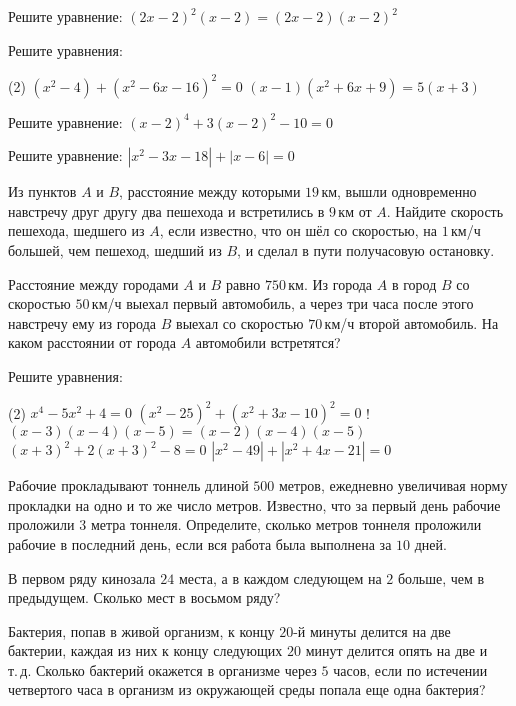 \begin{class}[number=3]
	\begin{listofex}
		\item Решите уравнение:
		\((2x-2)^2(x-2)=(2x-2)(x-2)^2\)
		\item Решите уравнения: 
		\begin{tasks}(2)
			\task \((x^2-4)+(x^2-6x-16)^2=0\)
			\task \( (x-1)(x^2+6x+9)=5(x+3) \)
		\end{tasks}
		\item Решите уравнение: \quad \( (x-2)^4+3(x-2)^2-10=0 \)
		\item Решите уравнение: \quad \( |x^2-3x-18|+|x-6|=0 \)
		\item Из пунктов \( A \) и \( B \), расстояние между которыми \( 19 \) км, вышли одновременно навстречу друг другу два пешехода и встретились в \( 9 \) км от \( A \). Найдите скорость пешехода, шедшего из \( A \), если известно, что он шёл со скоростью, на \( 1 \) км/ч большей, чем пешеход, шедший из \( B \), и сделал в пути получасовую остановку.
		\item Расстояние между городами \( A \) и \( B \) равно \( 750 \) км. Из города \( A \) в город \( B \) со скоростью \( 50 \) км/ч выехал первый автомобиль, а через три часа после этого навстречу ему из города \( B \) выехал со скоростью \( 70 \) км/ч второй автомобиль. На каком расстоянии от города \( A \) автомобили встретятся?
	\end{listofex}
\end{class}

\begin{class}[number=4]
	\begin{listofex}
		\item Решите уравнения:
		\begin{tasks}(2)
			\task \( x^4-5x^2+4=0 \)
			\task \( (x^2-25)^2+(x^2+3x-10)^2=0 \)
			\task! \( (x-3)(x-4)(x-5)=(x-2)(x-4)(x-5) \)
			\task \( (x+3)^2+2(x+3)^2-8=0 \)
			\task \( |x^2-49|+|x^2+4x-21|=0 \)
		\end{tasks}
		\item Рабочие прокладывают тоннель длиной \( 500 \) метров, ежедневно увеличивая норму прокладки на одно и то же число метров. Известно, что за первый день рабочие проложили \( 3 \) метра тоннеля. Определите, сколько метров тоннеля проложили рабочие в последний день, если вся работа была выполнена за \( 10 \) дней.
		\item В первом ряду кинозала \( 24 \) места, а в каждом следующем на \( 2 \) больше, чем в предыдущем. Сколько мест в восьмом ряду?
		\item Бактерия, попав в живой организм, к концу \( 20 \)-й минуты делится на две бактерии, каждая из них к концу следующих \( 20 \) минут делится опять на две и т. д. Сколько бактерий окажется в организме через \( 5 \) часов, если по истечении четвертого часа в организм из окружающей среды попала еще одна бактерия?
	\end{listofex}
\end{class}

